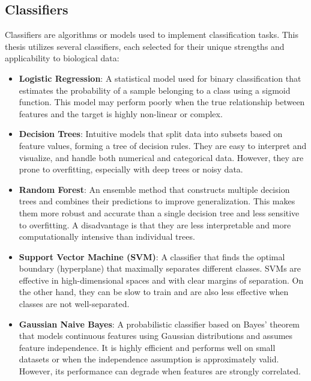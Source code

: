 \documentclass[12pt,a4paper]{report}
\begin{document}
\subsection{Classifiers}
Classifiers are algorithms or models used to implement classification tasks. This thesis utilizes several classifiers, each selected for their unique strengths and applicability to biological data:
\begin{itemize}
    \item \textbf{Logistic Regression}: A statistical model used for binary classification that estimates the probability of a sample belonging to a class using a sigmoid function. This model may perform poorly when the true relationship between features and the target is highly non-linear or complex.
    \item \textbf{Decision Trees}: Intuitive models that split data into subsets based on feature values, forming a tree of decision rules. They are easy to interpret and visualize, and handle both numerical and categorical data. However, they are prone to overfitting, especially with deep trees or noisy data.
    \item \textbf{Random Forest}: An ensemble method that constructs multiple decision trees and combines their predictions to improve generalization. This makes them more robust and accurate than a single decision tree and less sensitive to overfitting. A disadvantage is that they are less interpretable and more computationally intensive than individual trees.
    \item \textbf{Support Vector Machine (SVM)}: A classifier that finds the optimal boundary (hyperplane) that maximally separates different classes. SVMs are effective in high-dimensional spaces and with clear margins of separation. On the other hand, they can be slow to train and are also less effective when classes are not well-separated.
    \item \textbf{Gaussian Naive Bayes}: A probabilistic classifier based on Bayes’ theorem that models continuous features using Gaussian distributions and assumes feature independence. It is highly efficient and performs well on small datasets or when the independence assumption is approximately valid. However, its performance can degrade when features are strongly correlated.
\end{itemize}
\end{document}
